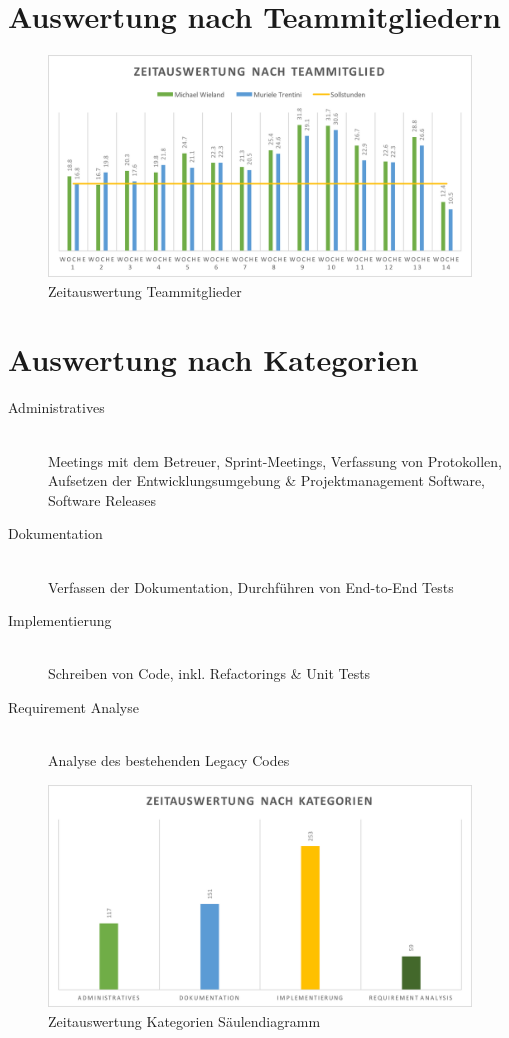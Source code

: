 \documentclass[11pt,a4paper,english,oneside]{book}
\numberwithin{equation}{chapter}
\begin{document}
	\section{Auswertung nach Teammitgliedern}
	\begin{figure}[h!]
		\centering
		\includegraphics[width=\linewidth]{assets/images/zeitauswertung-team}
		\caption{Zeitauswertung Teammitglieder}
		\label{zeitauswertung-team}
	\end{figure}
	
	\section{Auswertung nach Kategorien}
	\begin{description}
		\item[Administratives] \hfill \\ 
		Meetings mit dem Betreuer, Sprint-Meetings, Verfassung von Protokollen, Aufsetzen der Entwicklungsumgebung \& Projektmanagement Software, Software Releases
		\item[Dokumentation] \hfill \\ 
		Verfassen der Dokumentation, Durchführen von End-to-End Tests
		\item[Implementierung] \hfill \\ 
		Schreiben von Code, inkl. Refactorings \& Unit Tests
		\item[Requirement Analyse] \hfill \\ 
		Analyse des bestehenden Legacy Codes
	\end{description}
	\begin{figure}[h!]
		\centering
		\includegraphics[width=\linewidth]{assets/images/zeitauswertung-kat}
		\caption{Zeitauswertung Kategorien Säulendiagramm}
		\label{zeitauswertung-kategorien}
	\end{figure}
	
\end{document}
